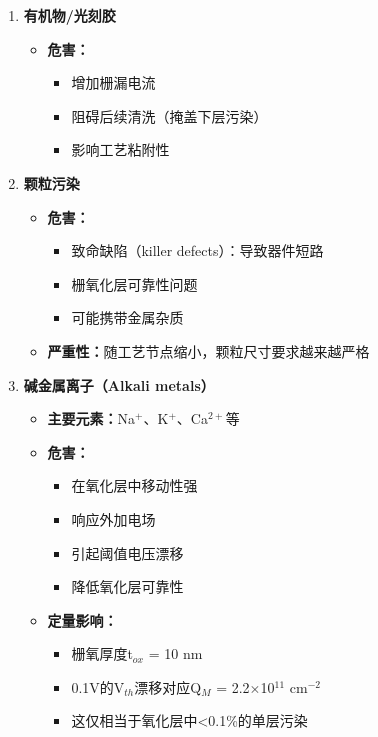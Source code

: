 \documentclass[UTF8,12pt,a4paper]{ctexart}
\begin{document}
\begin{enumerate}
    \item \textbf{有机物/光刻胶}
    \begin{itemize}
        \item \textbf{危害：}
        \begin{itemize}
            \item 增加栅漏电流
            \item 阻碍后续清洗（掩盖下层污染）
            \item 影响工艺粘附性
        \end{itemize}
    \end{itemize}
    
    \item \textbf{颗粒污染}
    \begin{itemize}
        \item \textbf{危害：}
        \begin{itemize}
            \item 致命缺陷（killer defects）：导致器件短路
            \item 栅氧化层可靠性问题
            \item 可能携带金属杂质
        \end{itemize}
        \item \textbf{严重性：}随工艺节点缩小，颗粒尺寸要求越来越严格
    \end{itemize}
    
    \item \textbf{碱金属离子（Alkali metals）}
    \begin{itemize}
        \item \textbf{主要元素：}Na$^+$、K$^+$、Ca$^{2+}$等
        \item \textbf{危害：}
        \begin{itemize}
            \item 在氧化层中移动性强
            \item 响应外加电场
            \item 引起阈值电压漂移
            \item 降低氧化层可靠性
        \end{itemize}
        \item \textbf{定量影响：}
        \begin{itemize}
            \item 栅氧厚度t$_{ox}$ = 10 nm
            \item 0.1V的V$_{th}$漂移对应Q$_M$ = 2.2$\times$10$^{11}$ cm$^{-2}$
            \item 这仅相当于氧化层中<0.1\%的单层污染
        \end{itemize}
    \end{itemize}
    

\end{enumerate}
\end{document}
